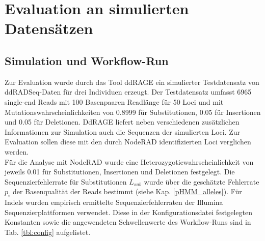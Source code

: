 \chapter{Evaluation an simulierten Datensätzen} \label{sec:eval}

\section{Simulation und Workflow-Run} \label{sec:sim}

Zur Evaluation wurde durch das Tool ddRAGE \cite{timm_2018, ddrage} ein simulierter Testdatensatz \cite{testdata} von ddRADSeq-Daten für drei Individuen erzeugt. Der Testdatensatz umfasst 6965 single-end Reads mit 100 Basenpaaren Readlänge für 50 Loci und mit Mutationswahrscheinlichkeiten von 0.8999 für Substitutionen, 0.05 für Insertionen und 0.05 für Deletionen. DdRAGE liefert neben verschiedenen zusätzlichen Informationen zur Simulation auch die Sequenzen der simulierten Loci. Zur Evaluation sollen diese mit den durch NodeRAD identifizierten Loci verglichen werden.\\

Für die Analyse mit NodeRAD wurde eine Heterozygotiewahrscheinlichkeit von jeweils 0.01 für Substitutionen, Insertionen und Deletionen festgelegt. Die Sequenzierfehlerrate für Substitutionen $L_{sub}$ wurde über die geschätzte Fehlerrate $p_{i}$ der Basenqualität der Reads bestimmt (siehe Kap. \ref{pHMM_alleles}). Für Indels wurden empirisch ermittelte Sequenzierfehlerraten der Illumina Sequenzierplattformen \cite{schirmer_2016} verwendet. Diese in der Konfigurationsdatei festgelegten Konstanten sowie die angewendeten Schwellenwerte des Workflow-Runs sind in Tab. \ref{tbl:config} aufgelistet. \\

